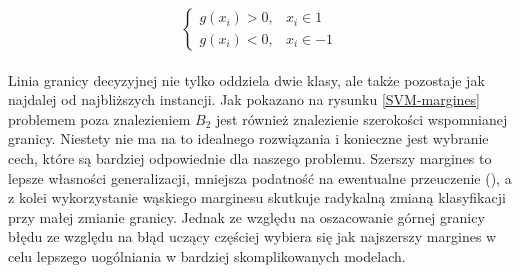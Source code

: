 \[
    \begin{cases}
            g(x_{i}) > 0,& x_{i} \in 1 \\
            g(x_{i}) < 0,& x_{i} \in -1
    \end{cases}
\]
\\

Linia granicy decyzyjnej nie tylko oddziela dwie klasy, ale także pozostaje jak najdalej od najbliższych instancji. Jak pokazano na rysunku \ref{SVM-margines} problemem poza znalezieniem $B_{2}$ jest również znalezienie szerokości wspomnianej granicy. Niestety nie ma na to idealnego rozwiązania i konieczne jest wybranie cech, które są bardziej odpowiednie dla naszego problemu. Szerszy margines to lepsze własności generalizacji, mniejsza podatność na
ewentualne przeuczenie (), a z kolei wykorzystanie wąskiego marginesu skutkuje radykalną zmianą klasyfikacji przy małej zmianie granicy. Jednak ze względu na oszacowanie górnej granicy błędu ze względu na błąd uczący częściej wybiera się jak najszerszy margines w celu lepszego uogólniania w bardziej skomplikowanych modelach.


